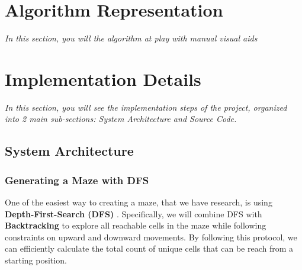 \documentclass[a4paper,12pt]{article}
\begin{document}
\newpage

\section{Algorithm Representation}
\textit{In this section, you will the algorithm at play with manual visual aids}



\newpage

\section{Implementation Details}
\textit{In this section, you will see the implementation steps of the project, organized into 2 main sub-sections: System Architecture and Source Code.}

\subsection{System Architecture}
\subsubsection{Generating a Maze with DFS}
One of the easiest way to creating a maze, that we have research, is using \textbf{Depth-First-Search (DFS)} \parencite{wiki:maze-generation}. Specifically, we will combine DFS with \textbf{Backtracking} to explore all reachable cells in the maze while following constraints on upward and downward movements. By following this protocol, we can efficiently calculate the total count of unique cells that can be reach from a starting position.
\end{document}
